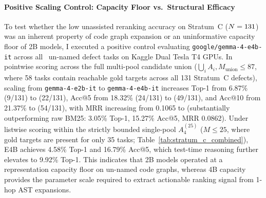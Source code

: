 \documentclass[10pt]{article}
\begin{document}
\paragraph{Positive Scaling Control: Capacity Floor vs.\ Structural Efficacy}
To test whether the low unassisted reranking accuracy on Stratum~C ($N=131$) was an inherent property of code graph expansion or an uninformative capacity floor of 2B models, I executed a positive control evaluating \texttt{google/gemma-4-e4b-it} across all \GemmaFourEFourBTasks\ un-named defect tasks on Kaggle Dual Tesla T4 GPUs. In pointwise scoring across the full multi-pool candidate union ($\bigcup_i A_i, M_{\text{union}} \le 87$, where 58 tasks contain reachable gold targets across all 131 Stratum~C defects), scaling from \texttt{gemma-4-e2b-it} to \texttt{gemma-4-e4b-it} increases Top-1 from 6.87\% (9/131) to \textbf{\GemmaFourEFourBAccOne} (22/131), Acc@5 from 18.32\% (24/131) to \textbf{\GemmaFourEFourBAccFive} (49/131), and Acc@10 from 21.37\% to \textbf{\GemmaFourEFourBAccTen} (54/131), with MRR increasing from 0.1065 to \textbf{\GemmaFourEFourBMRR} (substantially outperforming raw BM25: 3.05\% Top-1, 15.27\% Acc@5, MRR 0.0862). Under listwise scoring within the strictly bounded single-pool $A_4^{(25)}$ ($M \le 25$, where gold targets are present for only 35 tasks; Table~\ref{tab:stratum_c_combined}), E4B achieves 4.58\% Top-1 and 16.79\% Acc@5, which test-time reasoning further elevates to 9.92\% Top-1. This indicates that 2B models operated at a representation capacity floor on un-named code graphs, whereas 4B capacity provides the parameter scale required to extract actionable ranking signal from 1-hop AST expansions.
\end{document}
